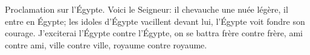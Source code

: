 Proclamation sur l’Égypte.
Voici le Seigneur: il chevauche une nuée légère, il entre en Égypte;
	les idoles d’Égypte vacillent devant lui, l’Égypte voit fondre son courage.
J’exciterai l’Égypte contre l’Égypte,
	on se battra frère contre frère, ami contre ami,
	ville contre ville, royaume contre royaume.
